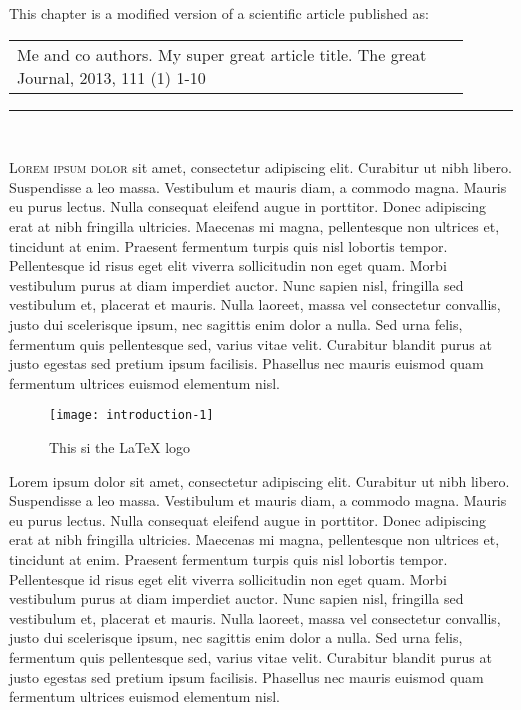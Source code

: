 
\noindent This chapter is a modified version of a scientific article published as:\\
 
\begin{tabular}{|p{0.9\linewidth}}
Me and co authors. My super great article title. The great Journal, 2013, 111 (1) 1-10 \\
\end{tabular}

\begin{center}
\rule{0.5\linewidth}{0.5pt} \\
\end{center}

\lettrine{L}{orem ipsum dolor} sit amet, consectetur adipiscing elit. Curabitur ut nibh libero. Suspendisse a leo massa. Vestibulum et mauris diam, a commodo magna. Mauris eu purus lectus. Nulla consequat eleifend augue in porttitor. Donec adipiscing erat at nibh fringilla ultricies. Maecenas mi magna, pellentesque non ultrices et, tincidunt at enim. Praesent fermentum turpis quis nisl lobortis tempor. Pellentesque id risus eget elit viverra sollicitudin non eget quam. Morbi vestibulum purus at diam imperdiet auctor. Nunc sapien nisl, fringilla sed vestibulum et, placerat et mauris. Nulla laoreet, massa vel consectetur convallis, justo dui scelerisque ipsum, nec sagittis enim dolor a nulla. Sed urna felis, fermentum quis pellentesque sed, varius vitae velit. Curabitur blandit purus at justo egestas sed pretium ipsum facilisis. Phasellus nec mauris euismod quam fermentum ultrices euismod elementum nisl.
\\

\begin{figure}[htbp]
\begin{center}
\texttt{[image: introduction-1]}
\caption[\LaTeX{} logo]{This si the \LaTeX{} logo}
\label{fig:intro:1}
\end{center}
\end{figure}	

Lorem ipsum dolor sit amet, consectetur adipiscing elit. Curabitur ut nibh libero. Suspendisse a leo massa. Vestibulum et mauris diam, a commodo magna. Mauris eu purus lectus. Nulla consequat eleifend augue in porttitor. Donec adipiscing erat at nibh fringilla ultricies. Maecenas mi magna, pellentesque non ultrices et, tincidunt at enim. Praesent fermentum turpis quis nisl lobortis tempor. Pellentesque id risus eget elit viverra sollicitudin non eget quam. Morbi vestibulum purus at diam imperdiet auctor. Nunc sapien nisl, fringilla sed vestibulum et, placerat et mauris. Nulla laoreet, massa vel consectetur convallis, justo dui scelerisque ipsum, nec sagittis enim dolor a nulla. Sed urna felis, fermentum quis pellentesque sed, varius vitae velit. Curabitur blandit purus at justo egestas sed pretium ipsum facilisis. Phasellus nec mauris euismod quam fermentum ultrices euismod elementum nisl.

